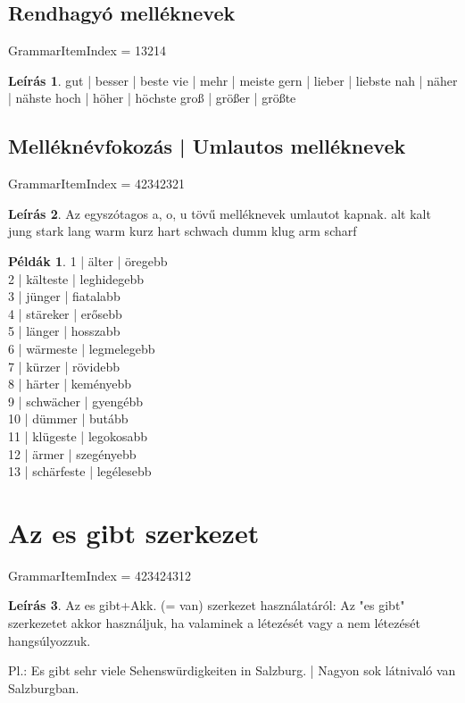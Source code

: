 \documentclass{article}
\theoremstyle{definition}
\newtheorem*{exmp}{Példák}
\newtheorem*{desc}{Leírás}
\begin{document}
\subsection{Rendhagyó melléknevek}

GrammarItemIndex = 13214

\begin{desc}
gut | besser | beste
vie | mehr | meiste
gern | lieber | liebste
nah | näher | nähste
hoch | höher | höchste
groß | größer | größte
\end{desc}

\subsection{Melléknévfokozás | Umlautos melléknevek}

GrammarItemIndex = 42342321

\begin{desc}
Az egyszótagos a, o, u tövű melléknevek umlautot kapnak.
alt
kalt
jung
stark
lang
warm
kurz
hart
schwach
dumm
klug
arm
scharf
\end{desc}

\begin{exmp}
1 | älter | öregebb\\
2 | kälteste | leghidegebb\\
3 | jünger | fiatalabb\\
4 | stäreker | erősebb\\
5 | länger | hosszabb\\
6 | wärmeste | legmelegebb\\
7 | kürzer | rövidebb\\
8 | härter | keményebb\\
9 | schwächer | gyengébb\\
10 | dümmer | butább\\
11 | klügeste | legokosabb\\
12 | ärmer | szegényebb\\
13 | schärfeste | legélesebb\\
\end{exmp}

\section{Az es gibt szerkezet}

GrammarItemIndex = 423424312

\begin{desc}
Az es gibt+Akk. (= van) szerkezet használatáról: Az "es gibt" szerkezetet akkor használjuk, ha valaminek a létezését vagy a nem létezését hangsúlyozzuk.

Pl.: Es gibt sehr viele Sehenswürdigkeiten in Salzburg. | Nagyon sok látnivaló van Salzburgban.
\end{desc}
\end{document}
